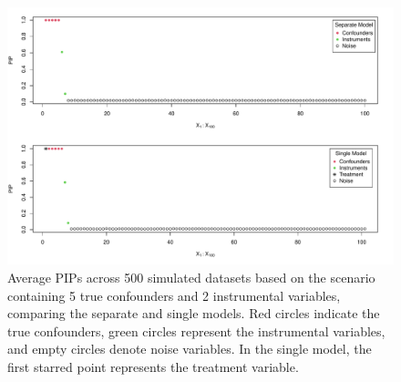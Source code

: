 \begin{figure}[htbp]
\includegraphics[width=\linewidth]{fig/pip_s3.pdf}
\caption{Average PIPs across 500 simulated datasets based on the scenario containing 5 true confounders and 2 instrumental variables, comparing the separate and single models. Red circles indicate the true confounders, green circles represent the instrumental variables, and empty circles denote noise variables. In the single model, the first starred point represents the treatment variable.} \label{Fig:A3}
\end{figure}
